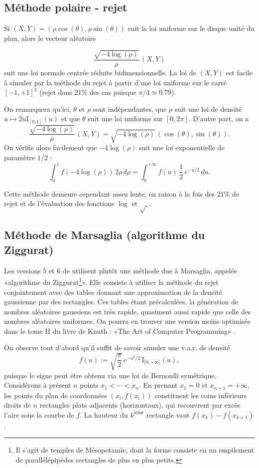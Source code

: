 \subsection{Méthode polaire - rejet}

Si $(X,Y)=(\rho\cos(\theta),\rho\sin(\theta))$ suit la loi uniforme sur le
disque unité du plan, alors le vecteur aléatoire

$$
\frac{\sqrt{-4\log(\rho)}}{\rho}\,(X,Y)
$$
suit une loi normale centrée réduite bidimensionnelle.  La loi de $(X,Y)$
est facile à simuler par la méthode du rejet à partir d'une loi uniforme sur
le carré $[-1,+1]^2$ (rejet dans 21\% des cas puisque $\pi/4\simeq 0.79$).

On remarquera qu'ici, $\theta$ et $\rho$ sont indépendantes, que $\rho$ suit une loi de
densité $u\mapsto 2u\mathrm{I}_{[0,1]}(u)$ et que $\theta$ suit une loi uniforme sur
$[0,2\pi]$. D'autre part, on a
$$
\frac{\sqrt{-4\log(\rho)}}{\rho}\,(X,Y) 
= \sqrt{-4\log(\rho)}\,(\cos(\theta),\sin(\theta)).
$$
On vérifie alors facilement que $-4\log(\rho)$ suit une loi exponentielle de
paramètre $1/2$ :
$$
\int_0^1 \!\!\!f(-4\log(\rho))\,2\rho\,d\rho
=
\int_0^{+\infty} \!\!\!f(u)\,\frac{1}{2}\,e^{-u/2}\,du.
$$

Cette méthode demeure cependant assez lente, en raison à la fois des 21\% de rejet et de
l'évaluation des fonctions $\log$ et $\sqrt{\ }$.

\subsection{Méthode de Marsaglia (algorithme du Ziggurat)}

Les versions 5 et 6 de \ML{} utilisent plutôt une méthode due à Marsaglia,
appelée «algorithme du Ziggurat\footnote{Il s'agit de temples de Mésopotamie,
  dont la forme consiste en un empilement de parallélépipèdes rectangles de
  plus en plus petits.}».  Elle consiste à utiliser la méthode du rejet
conjointement avec des tables donnant une approximation de la densité
gaussienne par des rectangles.  Ces tables étant précalculées, la génération
de nombres aléatoires gaussiens est très rapide, quasiment aussi rapide que
celle des nombres aléatoires uniformes.  On pourra en trouver une version
moins optimisée dans le tome II du livre de Knuth : «The Art of Computer
Programming» \cite{knuth-taocp-2-3}.

On observe tout d'abord qu'il suffit de savoir simuler une v.a.r.  de
densité
$$
f(u):=\sqrt{\frac{\pi}{2}}\,e^{-u^2/2}\,\mathrm{I}_{[0,+\infty[}(u),
$$
puisque le signe peut être obtenu via une loi de Bernoulli symétrique.
Considérons à présent $n$ points $x_1<\cdots<x_n$.  En prenant $x_1=0$ et
$x_{n+1}=+\infty$, les points du plan de coordonnées $(x_i,f(x_i))$ constituent les
coins inférieurs droits de $n$ rectangles plats adjacents (horizontaux), qui
recouvrent par excès l'aire sous la courbe de $f$.  La hauteur du
$k^\text{ième}$ rectangle vaut $f(x_k)-f(x_{k+1})$.

